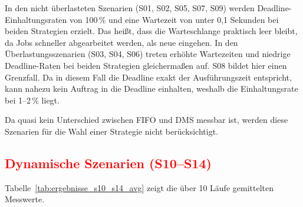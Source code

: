 \documentclass[
    12pt,               
    a4paper,            
    ngerman,            
    parskip=half,       
    headings=normal,   
    numbers=enddot,     
    toc=chapterentrywithdots 
]{scrreprt}\usepackage[utf8]{inputenc}
\begin{document}
In den nicht überlasteten Szenarien (S01, S02, S05, S07, S09) werden Deadline-Einhaltungsraten von 100\,\% und eine Wartezeit von unter 0,1 Sekunden bei beiden Strategien erzielt. Das heißt, dass die Warteschlange praktisch leer bleibt, da Jobs schneller abgearbeitet werden, als neue eingehen. In den Überlastungsszenarien (S03, S04, S06) treten erhöhte Wartezeiten und niedrige Deadline-Raten bei beiden Strategien gleichermaßen auf. S08 bildet hier einen Grenzfall. Da in diesem Fall die Deadline exakt der Ausführungszeit entspricht, kann nahezu kein Auftrag in die Deadline einhalten, weshalb die Einhaltungsrate bei 1--2\,\% liegt.

Da quasi kein Unterschied zwischen FIFO und DMS messbar ist, werden diese Szenarien für die Wahl einer Strategie nicht berücksichtigt.

\newpage
\subsection{\textcolor{red}{Dynamische Szenarien (S10--S14)}}

Tabelle~\ref{tab:ergebnisse_s10_s14_avg} zeigt die über 10 Läufe gemittelten Messwerte.

\begin{table}[H]
    \centering
    \caption{Gemittelte Messergebnisse der dynamischen Szenarien S10--S14 (Ø über 10 Läufe, je 100 Jobs)}
    \label{tab:ergebnisse_s10_s14_avg}
\end{table}
\end{document}
